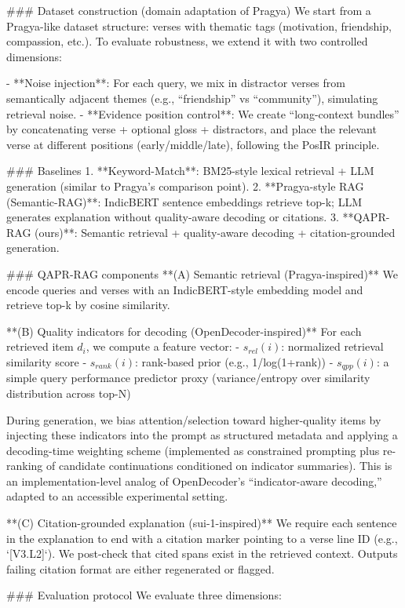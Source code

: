 ### Dataset construction (domain adaptation of Pragya)  
We start from a Pragya-like dataset structure: verses with thematic tags (motivation, friendship, compassion, etc.). To evaluate robustness, we extend it with two controlled dimensions:

- **Noise injection**: For each query, we mix in distractor verses from semantically adjacent themes (e.g., “friendship” vs “community”), simulating retrieval noise.
- **Evidence position control**: We create “long-context bundles” by concatenating verse + optional gloss + distractors, and place the relevant verse at different positions (early/middle/late), following the PosIR principle.

### Baselines  
1. **Keyword-Match**: BM25-style lexical retrieval + LLM generation (similar to Pragya’s comparison point).
2. **Pragya-style RAG (Semantic-RAG)**: IndicBERT sentence embeddings retrieve top-k; LLM generates explanation without quality-aware decoding or citations.
3. **QAPR-RAG (ours)**: Semantic retrieval + quality-aware decoding + citation-grounded generation.

### QAPR-RAG components  
**(A) Semantic retrieval (Pragya-inspired)**  
We encode queries and verses with an IndicBERT-style embedding model and retrieve top-k by cosine similarity.

**(B) Quality indicators for decoding (OpenDecoder-inspired)**  
For each retrieved item \(d_i\), we compute a feature vector:
- \(s_{rel}(i)\): normalized retrieval similarity score  
- \(s_{rank}(i)\): rank-based prior (e.g., 1/log(1+rank))  
- \(s_{qpp}(i)\): a simple query performance predictor proxy (variance/entropy over similarity distribution across top-N)

During generation, we bias attention/selection toward higher-quality items by injecting these indicators into the prompt as structured metadata and applying a decoding-time weighting scheme (implemented as constrained prompting plus re-ranking of candidate continuations conditioned on indicator summaries). This is an implementation-level analog of OpenDecoder’s “indicator-aware decoding,” adapted to an accessible experimental setting.

**(C) Citation-grounded explanation (sui-1-inspired)**  
We require each sentence in the explanation to end with a citation marker pointing to a verse line ID (e.g., `[V3.L2]`). We post-check that cited spans exist in the retrieved context. Outputs failing citation format are either regenerated or flagged.

### Evaluation protocol  
We evaluate three dimensions:

